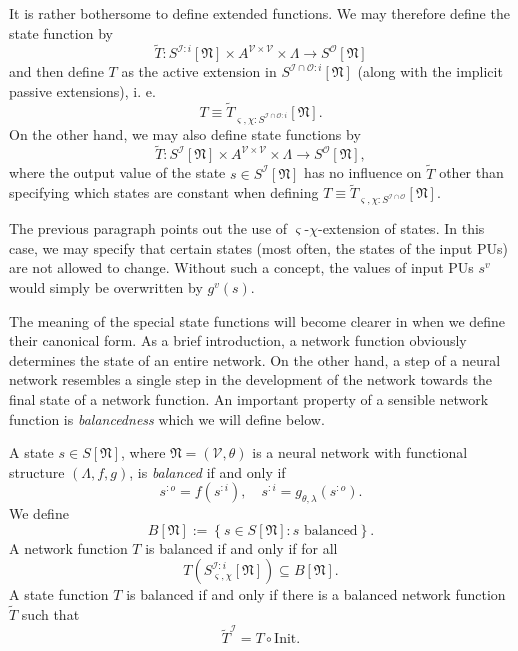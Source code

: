 \documentclass[a4paper,11pt]{report}
\newcommand{\const}{\varsigma} %
\newcommand{\var}{\chi} %
\newcommand{\In}{\text{Init}}
\begin{document}
\begin{Not}
It is rather bothersome to define extended functions. We may therefore define the state function by 
\[
\tilde{T}:S^{\mathcal{I}:i}[\mathfrak{N}]\times A^{\mathcal{V}\times\mathcal{V}}\times\Lambda\to S^{\mathcal{O}}[\mathfrak{N}]
\]
and then define $T$ as the active extension in $S^{\mathcal{I}\cap\mathcal{O}:i}[\mathfrak{N}]$ (along with the implicit passive extensions), i. e.
\begin{equation}
T\equiv\tilde{T}_{\const,\var:S^{\mathcal{I}\cap\mathcal{O}:i}}[\mathfrak{N}].
\end{equation}
On the other hand, we may also define state functions by
\[
\tilde{T}:S^{\mathcal{I}}[\mathfrak{N}]\times A^{\mathcal{V}\times\mathcal{V}}\times\Lambda\to S^{\mathcal{O}}[\mathfrak{N}],
\]
where the output value of the state $s\in S^{\mathcal{I}}[\mathfrak{N}]$ has no influence on $\tilde{T}$ other than specifying which states are constant when defining $T\equiv \tilde{T}_{\const,\var:S^{\mathcal{I}\cap\mathcal{O}}}[\mathfrak{N}]$.
\end{Not}

\begin{Rem}
The previous paragraph points out the use of $\const$-$\var$-extension of states. In this case, we may specify that certain states (most often, the states of the input PUs) are not allowed to change. Without such a concept, the values of input PUs $s^v$ would simply be overwritten by $g^v(s)$.
\end{Rem}

\begin{Par}
The meaning of the special state functions will become clearer in  when we define their canonical form. As a brief introduction, a network function obviously determines the state of an entire network. On the other hand, a step of a neural network resembles a single step in the development of the network towards the final state of a network function. An important property of a sensible network function is \emph{balancedness} which we will define below.
\end{Par}

\begin{Def}[Balancedness]\label{def:balancedness}
A state $s\in S[\mathfrak{N}]$, where $\mathfrak{N}=(\mathcal{V},\theta)$ is a neural network with functional structure $(\Lambda,f,g)$, is \emph{balanced} if and only if 
\begin{equation}\label{eq:balancedness}
s^{:o}=f(s^{:i}),
\quad
s^{:i}=g_{\theta,\lambda}(s^{:o}).
\end{equation}
We define
\[
B[\mathfrak{N}]:=\left\{s\in S[\mathfrak{N}]:s\text{ balanced}\right\}.
\]
A network function $T$ is balanced if and only if for all 
\[
T\left(S^{\mathcal{I}:i}_{\const,\var}[\mathfrak{N}]\right)\subseteq B[\mathfrak{N}].
\]
A state function $T$ is balanced if and only if there is a balanced network function $\tilde{T}$ such that
\[
\tilde{T}^{\mathcal{I}}=T\circ\In.
\]
\end{Def}
\end{document}
